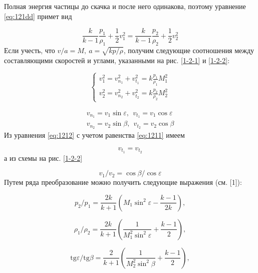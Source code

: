 \documentclass[specialist, subf, href, colorlinks=true, 14pt, final]{disser}
\theoremstyle{definition}
\newcommand{\tang}{\text{tg}}
\begin{document}
Полная энергия частицы до скачка и после него одинакова, поэтому уравнение \eqref{eq:121dd} примет вид
\addtocounter{equation}{1}
\begin{equation}\label{eq:1214}
  \frac{k}{k-1}\frac{p_1}{\rho_1} + \frac{1}{2}v_{1}^{2} = \frac{k}{k-1}\frac{p_2}{\rho_2} + \frac{1}{2}v_{2}^{2}
  \tag{14}
\end{equation}
Если учесть, что $v/a = M,\ a = \sqrt{kp/\rho}$, получим следующие  соотношения между составляющими скоростей и углами, указанными на рис. \ref{1-2-1} и \ref{1-2-2}:
\addtocounter{equation}{1}
\begin{equation}\label{eq:1215}
  \begin{cases}
  v_{1}^{2} = v_{n_1}^{2} + v_{t_1}^{2} = k\frac{p_1}{\rho_1}M_{1}^{2}\\
  v_{2}^{2} = v_{n_2}^{2} + v_{t_2}^{2} = k\frac{p_2}{\rho_2}M_{2}^{2}
  \end{cases}
  \tag{15}
\end{equation}
\addtocounter{equation}{1}
\begin{equation}\label{eq:1216}
  \begin{aligned}
  v_{n_1} = v_{1}\sin\varepsilon,\ \ v_{t_1} = v_{1}\cos\varepsilon\\
  v_{n_2} = v_{2}\sin\beta,\ \ v_{t_2} = v_{2}\cos\beta
  \end{aligned}
  \tag{16}
\end{equation}
Из уравнения \eqref{eq:1212} с учетом равенства \eqref{eq:1211} имеем
\addtocounter{equation}{1}
\begin{equation}\label{eq:1217}
  v_{t_1} = v_{t_2}
  \tag{17}
\end{equation}
а из схемы на рис. \ref{1-2-2}
\addtocounter{equation}{1}
\begin{equation}\label{eq:1218}
  v_{1}/v_{2} = \cos\beta/\cos\varepsilon
  \tag{18}
\end{equation}
Путем ряда преобразование можно получить следующие выражения (см. [1]):
\addtocounter{equation}{1}
\begin{equation}\label{eq:1219}
  p_{2}/p_{1} = \frac{2k}{k+1}\left(M_{1}\sin^{2}\varepsilon - \frac{k-1}{2k}\right),
  \tag{19}
\end{equation}
\addtocounter{equation}{1}
\begin{equation}\label{eq:1220}
  \rho_{1}/\rho_{2} = \frac{2k}{k+1}\left(\frac{1}{M_{1}^{2}\sin^{2}\varepsilon} + \frac{k-1}{2}\right),
  \tag{20}
\end{equation}
\addtocounter{equation}{1}
\begin{equation}\label{eq:1221}
  \tang\varepsilon/\tang\beta = \frac{2}{k+1}\left(\frac{1}{M_{2}^{2}\sin^{2}\beta} + \frac{k-1}{2}\right),
  \tag{21}
\end{equation}
\end{document}
